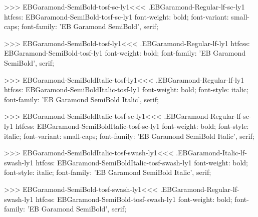 {{>>>
\<EBGaramond-SemiBold-tosf-sc-ly1\><<<
.EBGaramond-Regular-lf-sc-ly1
htfcss:  EBGaramond-SemiBold-tosf-sc-ly1  font-weight: bold; font-variant: small-caps; font-family: 'EB Garamond SemiBold', serif;

>>>
\<EBGaramond-SemiBold-tosf-ly1\><<<
.EBGaramond-Regular-lf-ly1
htfcss:  EBGaramond-SemiBold-tosf-ly1  font-weight: bold; font-family: 'EB Garamond SemiBold', serif;

>>>
\<EBGaramond-SemiBoldItalic-tosf-ly1\><<<
.EBGaramond-Regular-lf-ly1
htfcss:  EBGaramond-SemiBoldItalic-tosf-ly1  font-weight: bold; font-style: italic; font-family: 'EB Garamond SemiBold Italic', serif;

>>>
\<EBGaramond-SemiBoldItalic-tosf-sc-ly1\><<<
.EBGaramond-Regular-lf-sc-ly1
htfcss:  EBGaramond-SemiBoldItalic-tosf-sc-ly1  font-weight: bold; font-style: italic; font-variant: small-caps; font-family: 'EB Garamond SemiBold Italic', serif;

>>>
\<EBGaramond-SemiBoldItalic-tosf-swash-ly1\><<<
.EBGaramond-Italic-lf-swash-ly1
htfcss:  EBGaramond-SemiBoldItalic-tosf-swash-ly1  font-weight: bold; font-style: italic; font-family: 'EB Garamond SemiBold Italic', serif;

>>>
\<EBGaramond-SemiBold-tosf-swash-ly1\><<<
.EBGaramond-Regular-lf-swash-ly1
htfcss:  EBGaramond-SemiBold-tosf-swash-ly1  font-weight: bold; font-family: 'EB Garamond SemiBold', serif;

}}
